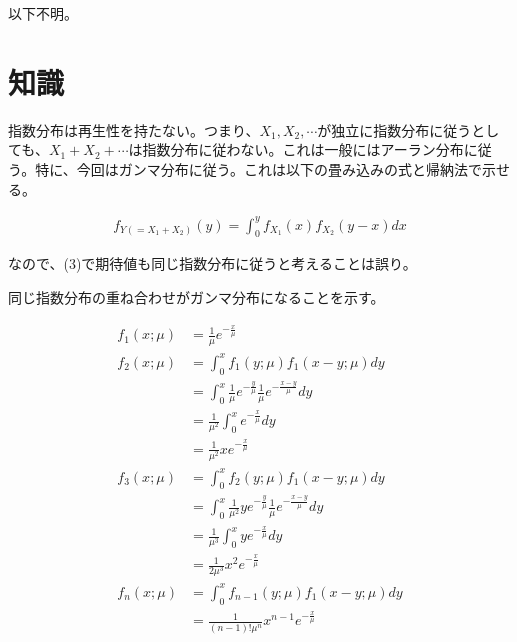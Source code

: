 \documentclass[a4paper, 10pt, dvipdfmx]{jlreq}
\begin{document}
以下不明。

\section{知識}

指数分布は再生性を持たない。つまり、$X_1,X_2,\cdots$が独立に指数分布に従うとしても、$X_1+X_2+\cdots$は指数分布に従わない。これは一般にはアーラン分布に従う。特に、今回はガンマ分布に従う。これは以下の畳み込みの式と帰納法で示せる。

\begin{align*}
  f_{Y(=X_1+X_2)}(y)=\int_0^{y}{f_{X_1}(x)f_{X_2}(y-x)dx}
\end{align*}

なので、(3)で期待値も同じ指数分布に従うと考えることは誤り。

同じ指数分布の重ね合わせがガンマ分布になることを示す。

\begin{align*}
  f_1(x;\mu) & =\frac{1}{\mu}e^{-\frac{x}{\mu}}                                                 \\
  f_2(x;\mu) & =\int_0^x{f_1(y;\mu)f_1(x-y;\mu)dy}                                              \\
             & =\int_0^x{\frac{1}{\mu}e^{-\frac{y}{\mu}}\frac{1}{\mu}e^{-\frac{x-y}{\mu}}dy}    \\
             & =\frac{1}{\mu^2}\int_0^x{e^{-\frac{x}{\mu}}dy}                                   \\
             & =\frac{1}{\mu^2}xe^{-\frac{x}{\mu}}                                              \\
  f_3(x;\mu) & =\int_0^x{f_2(y;\mu)f_1(x-y;\mu)dy}                                              \\
             & =\int_0^x{\frac{1}{\mu^2}ye^{-\frac{y}{\mu}}\frac{1}{\mu}e^{-\frac{x-y}{\mu}}dy} \\
             & =\frac{1}{\mu^3}\int_0^x{ye^{-\frac{x}{\mu}}dy}                                  \\
             & =\frac{1}{2\mu^3}x^2e^{-\frac{x}{\mu}}                                           \\
  f_n(x;\mu) & =\int_0^x{f_{n-1}(y;\mu)f_1(x-y;\mu)dy}                                          \\
             & =\frac{1}{(n-1)!\mu^n} x^{n-1} e^{-\frac{x}{\mu}}                                \\
\end{align*}
\end{document}
